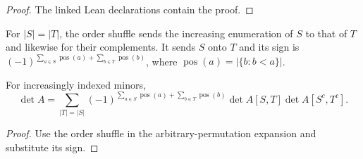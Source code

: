 \begin{proof}

\leanok

The linked Lean declarations contain the proof.

\end{proof}

\begin{definition}

\label{def:shuffle}


\leanok


For $|S|=|T|$, the order shuffle sends the increasing enumeration of $S$ to that of $T$
and likewise for their complements. It sends $S$ onto $T$ and its sign is
$(-1)^{\sum_{a\in S}\operatorname{pos}(a)+\sum_{b\in T}\operatorname{pos}(b)}$,
where $\operatorname{pos}(a)=|\{b:b<a\}|$.

\end{definition}

\begin{theorem}

\label{thm:generalized-laplace}


\leanok


For increasingly indexed minors,
\[ \det A=\sum_{|T|=|S|}(-1)^{\sum_{a\in S}\operatorname{pos}(a)+
 \sum_{b\in T}\operatorname{pos}(b)}\det A[S,T]\det A[S^c,T^c]. \]

\end{theorem}

\begin{proof}

\leanok

Use the order shuffle in the arbitrary-permutation expansion and substitute its sign.

\end{proof}
